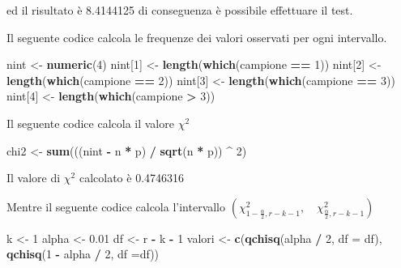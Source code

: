 \documentclass[]{book}
\newenvironment{Shaded}{\begin{snugshade}}{\end{snugshade}}
\newcommand{\KeywordTok}[1]{\textcolor[rgb]{0.13,0.29,0.53}{\textbf{#1}}}
\newcommand{\DataTypeTok}[1]{\textcolor[rgb]{0.13,0.29,0.53}{#1}}
\newcommand{\DecValTok}[1]{\textcolor[rgb]{0.00,0.00,0.81}{#1}}
\newcommand{\FloatTok}[1]{\textcolor[rgb]{0.00,0.00,0.81}{#1}}
\newcommand{\StringTok}[1]{\textcolor[rgb]{0.31,0.60,0.02}{#1}}
\newcommand{\OperatorTok}[1]{\textcolor[rgb]{0.81,0.36,0.00}{\textbf{#1}}}
\newcommand{\NormalTok}[1]{#1}
\begin{document}
ed il risultato è 8.4144125 di conseguenza è possibile effettuare il
test.

Il seguente codice calcola le frequenze dei valori osservati per ogni
intervallo.

\begin{Shaded}
\begin{Highlighting}[]
\NormalTok{nint <-}\StringTok{ }\KeywordTok{numeric}\NormalTok{(}\DecValTok{4}\NormalTok{)}
\NormalTok{nint[}\DecValTok{1}\NormalTok{] <-}\StringTok{ }\KeywordTok{length}\NormalTok{(}\KeywordTok{which}\NormalTok{(campione }\OperatorTok{==}\StringTok{ }\DecValTok{1}\NormalTok{))}
\NormalTok{nint[}\DecValTok{2}\NormalTok{] <-}\StringTok{ }\KeywordTok{length}\NormalTok{(}\KeywordTok{which}\NormalTok{(campione }\OperatorTok{==}\StringTok{ }\DecValTok{2}\NormalTok{))}
\NormalTok{nint[}\DecValTok{3}\NormalTok{] <-}\StringTok{ }\KeywordTok{length}\NormalTok{(}\KeywordTok{which}\NormalTok{(campione }\OperatorTok{==}\StringTok{ }\DecValTok{3}\NormalTok{))}
\NormalTok{nint[}\DecValTok{4}\NormalTok{] <-}\StringTok{ }\KeywordTok{length}\NormalTok{(}\KeywordTok{which}\NormalTok{(campione }\OperatorTok{>}\StringTok{ }\DecValTok{3}\NormalTok{))}
\end{Highlighting}
\end{Shaded}

Il seguente codice calcola il valore \(\chi^2\)

\begin{Shaded}
\begin{Highlighting}[]
\NormalTok{chi2 <-}\StringTok{ }\KeywordTok{sum}\NormalTok{(((nint }\OperatorTok{-}\StringTok{ }\NormalTok{n }\OperatorTok{*}\StringTok{ }\NormalTok{p) }\OperatorTok{/}\StringTok{ }\KeywordTok{sqrt}\NormalTok{(n }\OperatorTok{*}\StringTok{ }\NormalTok{p)) }\OperatorTok{^}\StringTok{ }\DecValTok{2}\NormalTok{)}
\end{Highlighting}
\end{Shaded}

Il valore di \(\chi^2\) calcolato è 0.4746316

Mentre il seguente codice calcola l'intervallo
\(\left( \chi^2_{1 - \frac{\alpha}{2},r-k-1}, \quad \chi^2_{\frac{\alpha}{2},r-k-1} \right)\)

\begin{Shaded}
\begin{Highlighting}[]
\NormalTok{k <-}\StringTok{ }\DecValTok{1}
\NormalTok{alpha <-}\StringTok{ }\FloatTok{0.01}
\NormalTok{df <-}\StringTok{ }\NormalTok{r }\OperatorTok{-}\StringTok{ }\NormalTok{k }\OperatorTok{-}\StringTok{ }\DecValTok{1}
\NormalTok{valori <-}\StringTok{ }\KeywordTok{c}\NormalTok{(}\KeywordTok{qchisq}\NormalTok{(alpha }\OperatorTok{/}\StringTok{ }\DecValTok{2}\NormalTok{, }\DataTypeTok{df =}\NormalTok{ df), }\KeywordTok{qchisq}\NormalTok{(}\DecValTok{1} \OperatorTok{-}\StringTok{ }\NormalTok{alpha }\OperatorTok{/}\StringTok{ }\DecValTok{2}\NormalTok{, }\DataTypeTok{df =}\NormalTok{df))}
\end{Highlighting}
\end{Shaded}
\end{document}
